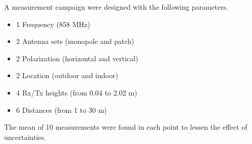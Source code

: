 \large
A measurement campaign were designed with the following parameters.
\begin{itemize}%
\item 1 Frequency (858 MHz)
\item 2 Antenna sets (monopole and patch)
\item 2 Polarization (horizontal and vertical)
\item 2 Location (outdoor and indoor)
\item 4 Rx/Tx heights (from 0.04 to 2.02 m)
\item 6 Distances (from 1 to 30 m)
\end{itemize}
The mean of 10 measurements were found in each point to lessen the effect of uncertainties. %

